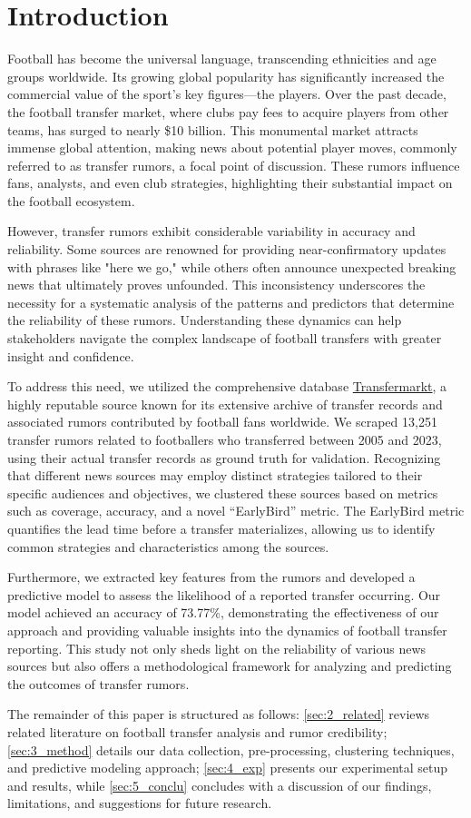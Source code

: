 \section{Introduction}
Football has become the universal language, transcending ethnicities and age groups worldwide. Its growing global popularity has significantly increased the commercial value of the sport’s key figures—the players. Over the past decade, the football transfer market, where clubs pay fees to acquire players from other teams, has surged to nearly \$10 billion. This monumental market attracts immense global attention, making news about potential player moves, commonly referred to as transfer rumors, a focal point of discussion. These rumors influence fans, analysts, and even club strategies, highlighting their substantial impact on the football ecosystem.

However, transfer rumors exhibit considerable variability in accuracy and reliability. Some sources are renowned for providing near-confirmatory updates with phrases like "here we go," while others often announce unexpected breaking news that ultimately proves unfounded. This inconsistency underscores the necessity for a systematic analysis of the patterns and predictors that determine the reliability of these rumors. Understanding these dynamics can help stakeholders navigate the complex landscape of football transfers with greater insight and confidence.

To address this need, we utilized the comprehensive database \href{www.transfermarkt.co.uk}{Transfermarkt}, a highly reputable source known for its extensive archive of transfer records and associated rumors contributed by football fans worldwide. We scraped 13,251 transfer rumors related to footballers who transferred between 2005 and 2023, using their actual transfer records as ground truth for validation. Recognizing that different news sources may employ distinct strategies tailored to their specific audiences and objectives, we clustered these sources based on metrics such as coverage, accuracy, and a novel “EarlyBird” metric. The EarlyBird metric quantifies the lead time before a transfer materializes, allowing us to identify common strategies and characteristics among the sources.

Furthermore, we extracted key features from the rumors and developed a predictive model to assess the likelihood of a reported transfer occurring. Our model achieved an accuracy of 73.77\%, demonstrating the effectiveness of our approach and providing valuable insights into the dynamics of football transfer reporting. This study not only sheds light on the reliability of various news sources but also offers a methodological framework for analyzing and predicting the outcomes of transfer rumors.

The remainder of this paper is structured as follows:  \autoref{sec:2_related} reviews related literature on football transfer analysis and rumor credibility; \autoref{sec:3_method} details our data collection, pre-processing, clustering techniques, and predictive modeling approach; \autoref{sec:4_exp} presents our experimental setup and results, while \autoref{sec:5_conclu} concludes with a discussion of our findings, limitations, and suggestions for future research.

